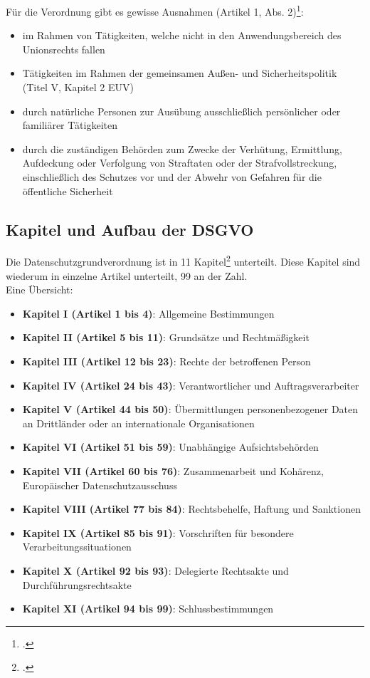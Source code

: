 Für die Verordnung gibt es gewisse Ausnahmen (Artikel 1, Abs. 2)\footcite{Lehrunterlagen-HTL-cloud}:
\begin{itemize}
	\item im Rahmen von Tätigkeiten, welche nicht in den Anwendungsbereich des Unionsrechts fallen
	\item Tätigkeiten im Rahmen der gemeinsamen Außen- und Sicherheitspolitik (Titel V, Kapitel 2 EUV)
	\item durch natürliche Personen zur Ausübung ausschließlich persönlicher oder familiärer Tätigkeiten
	\item durch die zuständigen Behörden zum Zwecke der Verhütung, Ermittlung, Aufdeckung oder Verfolgung von Straftaten oder der Strafvollstreckung, einschließlich des Schutzes vor und der Abwehr von Gefahren für die öffentliche Sicherheit
\end{itemize}

\subsection{Kapitel und Aufbau der DSGVO}
Die Datenschutzgrundverordnung ist in 11 Kapitel\footcite{dsgvo-wiki} unterteilt. Diese Kapitel sind wiederum in einzelne Artikel unterteilt, 99 an der Zahl.\\
Eine Übersicht:

\begin{itemize}
	\item \textbf{Kapitel I (Artikel 1 bis 4)}: Allgemeine Bestimmungen
	\item \textbf{Kapitel II (Artikel 5 bis 11)}: Grundsätze und Rechtmäßigkeit
	\item \textbf{Kapitel III (Artikel 12 bis 23)}: Rechte der betroffenen Person
	\item \textbf{Kapitel IV (Artikel 24 bis 43)}: Verantwortlicher und Auftragsverarbeiter
	\item \textbf{Kapitel V (Artikel 44 bis 50)}: Übermittlungen personenbezogener Daten an Drittländer oder an internationale Organisationen
	\item \textbf{Kapitel VI (Artikel 51 bis 59)}: Unabhängige Aufsichtsbehörden
	\item \textbf{Kapitel VII (Artikel 60 bis 76)}: Zusammenarbeit und Kohärenz, Europäischer Datenschutzausschuss
	\item \textbf{Kapitel VIII (Artikel 77 bis 84)}: Rechtsbehelfe, Haftung und Sanktionen
	\item \textbf{Kapitel IX (Artikel 85 bis 91)}: Vorschriften für besondere Verarbeitungssituationen
	\item \textbf{Kapitel X (Artikel 92 bis 93)}: Delegierte Rechtsakte und Durchführungsrechtsakte
	\item \textbf{Kapitel XI (Artikel 94 bis 99)}: Schlussbestimmungen
\end{itemize}

